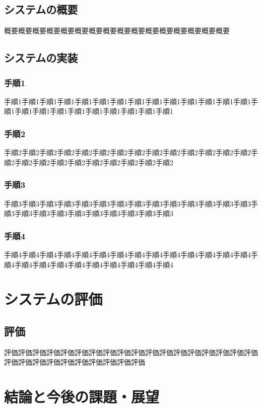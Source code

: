 \documentclass[11pt,a4j,uplatex]{jarticle}
\begin{document}
    \subsection{システムの概要}
    概要概要概要概要概要概要概要概要概要概要概要概要概要概要概要概要

    \subsection{システムの実装}
        \subsubsection{手順1}
        手順1手順1手順1手順1手順1手順1手順1手順1手順1手順1手順1手順1手順1手順1手順1手順1手順1手順1手順1手順1手順1手順1手順1手順1

        \subsubsection{手順2}
        手順2手順2手順2手順2手順2手順2手順2手順2手順2手順2手順2手順2手順2手順2手順2手順2手順2手順2手順2手順2手順2手順2手順2手順2

        \subsubsection{手順3}
        手順3手順3手順3手順3手順3手順3手順3手順3手順3手順3手順3手順3手順3手順3手順3手順3手順3手順3手順3手順3手順3手順3手順3手順3

        \subsubsection{手順4}
        手順4手順4手順4手順4手順4手順4手順4手順4手順4手順4手順4手順4手順4手順4手順4手順4手順4手順4手順4手順4手順4手順4手順4手順4

\newpage
\section{システムの評価}
    \subsection{評価}
    評価評価評価評価評価評価評価評価評価評価評価評価評価評価評価評価評価評価評価評価評価評価評価評価評価評価評価評価

\newpage
\section{結論と今後の課題・展望}
\end{document}
